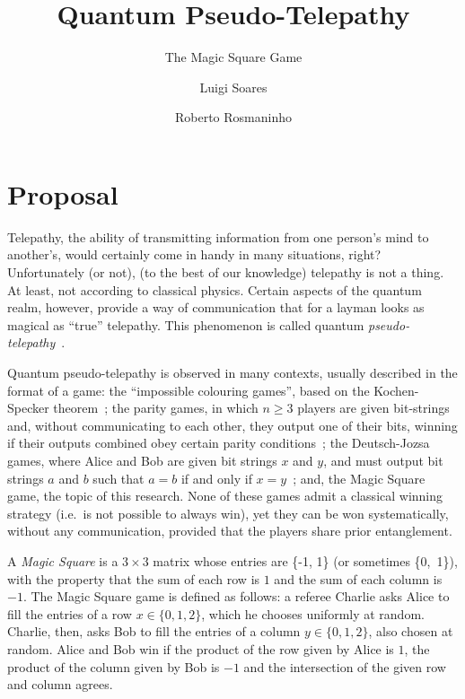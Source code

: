 \documentclass{llncs}
\begin{document}
\title{Quantum Pseudo-Telepathy}
\subtitle{The Magic Square Game}

\author{Luigi Soares \and Roberto Rosmaninho}

\maketitle

\section*{Proposal}
\label{sec:prop}

Telepathy, the ability of transmitting information from one person's
mind to another's, would certainly come in handy in many situations,
right? Unfortunately (or not), (to the best of our knowledge)
telepathy is not a thing. At least, not according to classical
physics. Certain aspects of the quantum realm, however, provide a way
of communication that for a layman looks as magical as ``true''
telepathy. This phenomenon is called quantum
\emph{pseudo-telepathy}~\cite{brassard:2005}.

Quantum pseudo-telepathy is observed in many contexts, usually
described in the format of a game: the ``impossible colouring games'',
based on the Kochen-Specker theorem~\cite{brassard:2005, xxx}; the
parity games, in which \(n \geq 3\) players are given bit-strings and,
without communicating to each other, they output one of their bits,
winning if their outputs combined obey certain parity
conditions~\cite{brassard:2005, xxx}; the Deutsch-Jozsa games, where
Alice and Bob are given bit strings \(x\) and \(y\), and must output
bit strings \(a\) and \(b\) such that \(a = b\) if and only if
\(x = y\)~\cite{brassard:2005, xxx}; and, the Magic Square game, the
topic of this research\cite{brassard:2005, xxx}. None of these games
admit a classical winning strategy (i.e.\ is not possible to always
win), yet they can be won systematically, without any communication,
provided that the players share prior
entanglement\cite{brassard:2005}.

A \emph{Magic Square} is a \(3 \times 3\) matrix whose entries are
\{-1, 1\} (or sometimes \{0,~1\}), with the property that the sum of
each row is \(1\) and the sum of each column is \(-1\). The Magic
Square game is defined as follows: a referee Charlie asks Alice to
fill the entries of a row \(x \in \{0, 1, 2\}\), which he chooses
uniformly at random. Charlie, then, asks Bob to fill the entries of a
column \(y \in \{0, 1, 2\}\), also chosen at random. Alice and Bob win
if the product of the row given by Alice is \(1\), the product of the
column given by Bob is \(-1\) and the intersection of the given row
and column agrees.
\end{document}
